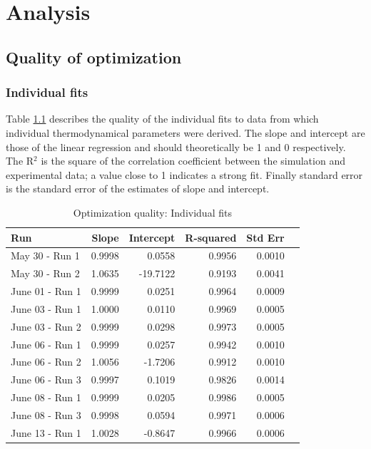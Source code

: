 \documentclass[letterpaper,titlepage,oneside]{report}
\begin{document}
\chapter{Analysis}
\label{ch:analysis}

\section{Quality of optimization}

\subsection*{Individual fits}
Table \ref{tab:optindividual} describes the quality of the individual fits to
data from which individual thermodynamical parameters were derived.
The slope and intercept are those of the linear regression and should
theoretically be 1 and 0 respectively. The R$^2$ is the square of the
correlation coefficient between the simulation and experimental data; a value
close to 1 indicates a strong fit. Finally standard error is the standard
error of the estimates of slope and intercept.

\begin{table}[ht]
  \caption{Optimization quality: Individual fits}
  \label{tab:optindividual}
  \centering
  \begin{tabularx}{0.75\textwidth}{|X|r|r|r|r|r|}
    \hline
    Run & Slope & Intercept & R-squared & Std Err \\
    \hline
    May  30 - Run 1   &   0.9998   &   0.0558   &    0.9956   &   0.0010 \\
    May  30 - Run 2   &   1.0635   & -19.7122   &    0.9193   &   0.0041 \\
    June 01 - Run 1   &   0.9999   &   0.0251   &    0.9964   &   0.0009 \\
    June 03 - Run 1   &   1.0000   &   0.0110   &    0.9969   &   0.0005 \\
    June 03 - Run 2   &   0.9999   &   0.0298   &    0.9973   &   0.0005 \\
    June 06 - Run 1   &   0.9999   &   0.0257   &    0.9942   &   0.0010 \\
    June 06 - Run 2   &   1.0056   &  -1.7206   &    0.9912   &   0.0010 \\
    June 06 - Run 3   &   0.9997   &   0.1019   &    0.9826   &   0.0014 \\
    June 08 - Run 1   &   0.9999   &   0.0205   &    0.9986   &   0.0005 \\
    June 08 - Run 3   &   0.9998   &   0.0594   &    0.9971   &   0.0006 \\
    June 13 - Run 1   &   1.0028   &  -0.8647   &    0.9966   &   0.0006 \\
    \hline
  \end{tabularx}
\end{table}
\end{document}
